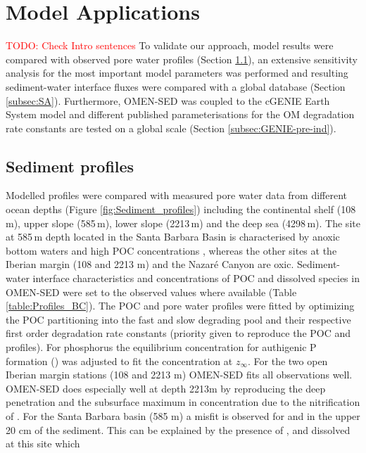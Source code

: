 \documentclass[gmd, manuscript]{copernicus}
\begin{document}
\section {Model Applications}
\textcolor{red}{TODO: Check Intro sentences}
To validate our approach, model results were compared with observed pore water profiles (Section \ref{subsec:SedProfiles}), an extensive sensitivity analysis for the most important model 
parameters was performed and resulting sediment-water interface fluxes were compared with a global database (Section \ref{subsec:SA}). Furthermore, OMEN-SED was coupled to the cGENIE Earth System model 
and different published parameterisations for the OM degradation rate constants are tested on a global scale (Section \ref{subsec:GENIE-pre-ind}).

\subsection{Sediment profiles}\label{subsec:SedProfiles}
Modelled profiles were compared with measured pore water data from different ocean depths (Figure \ref{fig:Sediment_profiles}) including the continental shelf (108\,m), upper slope (585\,m), lower slope (2213\,m) 
and the deep sea (4298\,m). The site at 585\,m depth located in the Santa Barbara Basin is characterised by anoxic bottom waters and high POC concentrations 
\citep[POC $\sim$5.5\,wt\%,][]{reimers_porewater_1996}, whereas the other sites at the Iberian margin (108 and 2213 m) and the Nazar\'e Canyon \citep[4298 m, ][]{epping_oxidation_2002} 
are oxic. 
Sediment-water interface characteristics and concentrations of POC and dissolved species in OMEN-SED were set to the observed values where available (Table \ref{table:Profiles_BC}). 
The POC and pore water profiles were fitted by optimizing the POC partitioning into the fast and slow degrading pool and their respective first order degradation rate constants (priority given to reproduce the POC and  profiles). 
For phosphorus the equilibrium concentration for authigenic P formation () was adjusted to fit the  concentration at $z_\infty$. 
For the two open Iberian margin stations (108 and 2213 m) OMEN-SED fits all observations well. OMEN-SED does especially well at depth 2213m by reproducing the deep  penetration and the subsurface maximum in  
concentration due to the nitrification of . 
For the Santa Barbara basin (585 m) a misfit is observed for  and  in the upper 20 cm of the sediment. This can be explained by the presence of ,  and dissolved  at this site which 
\end{document}

